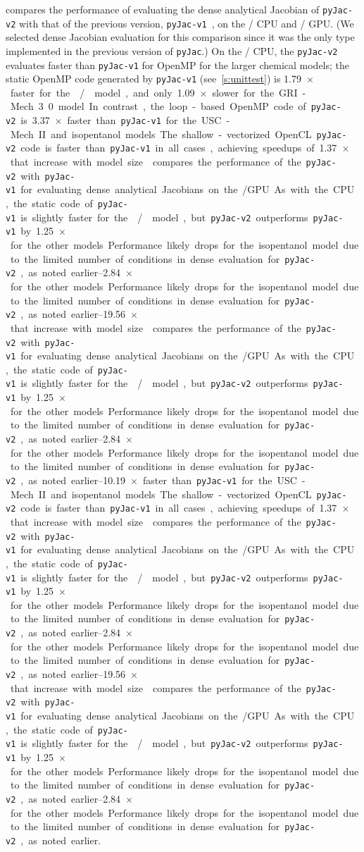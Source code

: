 \documentclass[12pt,number,sort&compress,preprint]{elsarticle}
\begin{document}
 compares the performance of evaluating the dense analytical Jacobian of \texttt{pyJac-v2} with that of the previous version, \texttt{pyJac-v1}~\cite{pyjac16}, on the \sse/ CPU and \gpuold/ GPU.
(We selected dense Jacobian evaluation for this comparison since it was the only type implemented in the previous version of \texttt{pyJac}.)
On the \sse/ CPU, the \texttt{pyJac-v2} evaluates faster than \texttt{pyJac-v1} for OpenMP for the larger chemical models; the static OpenMP code generated by \texttt{pyJac-v1} (see~\cref{s:unittest}) is \SI{1.79}{$\times$} faster for the \slash{} model, and only \SI{1.09}{$\times$} slower for the GRI-Mech 3.0 model.
In contrast, the loop-based OpenMP code of \texttt{pyJac-v2} is \SIrange{3.37}{10.19}{$\times$} faster than \texttt{pyJac-v1} for the USC-Mech II and isopentanol models.
The shallow-vectorized OpenCL \texttt{pyJac-v2} code is faster than \texttt{pyJac-v1} in all cases, achieving speedups of \SIrange{1.37}{19.56}{$\times$} that increase with model size.
 compares the performance of the \texttt{pyJac-v2} with \texttt{pyJac-v1} for evaluating dense analytical Jacobians on the \gpuold/ GPU.
As with the CPU, the static code of \texttt{pyJac-v1} is slightly faster for the \slash{} model, but \texttt{pyJac-v2} outperforms \texttt{pyJac-v1} by \SIrange{1.25}{2.84}{$\times$} for the other models.
Performance likely drops for the isopentanol model due to the limited number of conditions in dense evaluation for \texttt{pyJac-v2}, as noted earlier.
\end{document}
